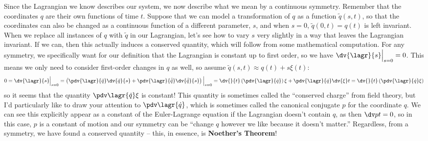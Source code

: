 \documentclass[12pt]{article}
\begin{document}
Since the Lagrangian we know describes our system, we now describe what we mean
by a continuous symmetry. Remember that the coordinates $q$ are their own
functions of time $t$. Suppose that we can model a transformation of $q$ as a
function $\tilde q(s, t)$, so that the coordinates can also be changed
as a continuous function of a different parameter, $s$, and when $s = 0$,
$\tilde q(0, t) = q(t)$ is left invariant. When we replace all instances of $q$ with
$\tilde q$ in our Lagrangian, let's see how to vary $s$ very
slightly in a way that leaves the Lagrangian invariant. If we can, then this actually induces a conserved quantity, which will
follow from some mathematical computation. For any symmetry, we 
specifically want for our definition that the
Lagrangian is constant up to first order, so we have $\dv{\lagr}{s}\Big|_{s=0} =
0$. This means we only need to consider first-order changes in $q$ as well, so
assume $\tilde q(s, t) \approx q(t) + s\xi(t)$:  
\[
  0 = \dv{\lagr}{s}\Big|_{s=0} 
  = \left(\pdv{\lagr}{\tilde q} \dv{\tilde q}{s} + \pdv{\lagr}{\dot{\tilde q}}
    \dv{\dot{\tilde q}}{s}\right)\Big|_{s=0}  
    = \dv{}{t} \left(\pdv{\lagr}{\dot{q}} \right) \xi +
  \pdv{\lagr}{\dot{q}} \dv{\xi}t   \\ 
    = \dv{}{t} \left(\pdv{\lagr}{\dot{q}} \xi \right) 
\]
so it seems that the quantity $\pdv \lagr {\dot q} \xi$ is constant!
This quantity is sometimes called the ``conserved charge'' from field theory,
but I'd particularly like to draw your attention to $\pdv \lagr {\dot q}$, which
is sometimes called the canonical conjugate  $p$ for the
coordinate $q$.  
We can see this explicitly appear as a constant of the Euler-Lagrange equation
if the Lagrangian doesn't contain $q$, as then $\dv p t = 0$, so in this
case, $p$ is a constant of motion and our symmetry can be ``change $q$ however
we like because it doesn't matter.'' 
Regardless, from a symmetry, we have found a conserved quantity -- this, in essence, is \textbf{Noether's Theorem}! 
\end{document}
